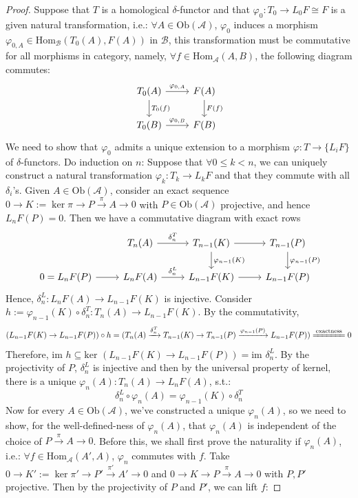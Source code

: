 \begin{proof}
    Suppose that $T$ is a homological $\delta$-functor and that $\varphi_0: T_0\to L_0F\cong F$ is a given natural transformation, i.e.: $\forall A\in \text{Ob} (\mathcal{A})$, $\varphi_0$ induces a morphism $\varphi_{0,A}\in \text{Hom}_\mathcal{B} (T_0(A) ,F(A))$ in $\mathcal{B}$, this transformation must be commutative for all morphisms in category, namely, $\forall f \in \text{Hom}_\mathcal{A} (A,B)$, the following diagram commutes:
    \[
    \begin{tikzcd}
        T_0(A) \arrow[r, "\varphi_{0,A}"] \arrow[d, "T_0(f)"] &F(A) \arrow[d, "F(f)"]\\
        T_0(B) \arrow[r, "\varphi_{0,B}"] &F(B)
    \end{tikzcd}
    \]
    We need to show that $\varphi_0$ admits a unique extension to a morphism $\varphi: T\to \{L_iF\}$ of $\delta$-functors. Do induction on $n$: Suppose that $\forall 0\leq k<n$, we can uniquely construct a natural transformation $\varphi_k: T_k\to L_kF$ and that they commute with all $\delta_i$'s. Given $A\in \text{Ob} (\mathcal{A})$, consider an exact sequence $0\to K:= \ker \pi\to P\xrightarrow{\pi} A\to0$ with $P\in \text{Ob} (\mathcal{A})$ projective, and hence $L_nF(P)=0$. Then we have a commutative diagram with exact rows
    \[
    \begin{tikzcd}
        &T_n (A)\arrow[r, "\delta_n^T"] &T_{n-1}(K) \arrow[r] \arrow[d, "\varphi_{n-1} (K)"]& T_{n-1} (P) \arrow[d, "\varphi_{n-1}(P)"]\\
        0=L_nF(P) \arrow[r] &L_nF(A) \arrow[r, "\delta_n^L"] &L_{n-1}F(K) \arrow[r] &L_{n-1}F(P)
    \end{tikzcd}
    \]
    Hence, $\delta_n^L: L_nF(A) \to L_{n-1} F(K)$ is injective. Consider $h:=\varphi _{n-1} (K) \circ \delta_n^T: T_n(A) \to L_{n-1} F(K)$. By the commutativity,
    \[
    (L_{n-1} F(K)\to L_{n-1} F(P)) \circ h=(T_n(A) \xrightarrow{\delta_n^T} T_{n-1} (K) \to T_{n-1} (P) \xrightarrow{\varphi_{n-1} (P)} L_{n-1} F(P)) \xlongequal{\text{exactness}} 0
    \]
    Therefore, $\text{im }h \subseteq \text{ker } (L_{n-1} F(K) \to L_{n-1} F(P))= \text{im }\delta_n^L$. By the projectivity of $P$, $\delta_n^L$ is injective and then by the universal property of kernel, there is a unique $\varphi_n(A): T_n(A) \to L_nF(A)$, s.t.:
    \[
    \delta_n^L \circ \varphi_n (A)= \varphi_{n-1} (K) \circ \delta_n^T
    \]
    Now for every $A\in \text{Ob} (\mathcal{A})$, we've constructed a unique $\varphi_n(A)$, so we need to show, for the well-defined-ness of $\varphi_n(A)$, that $\varphi_n (A)$ is independent of the choice of $P\xrightarrow{\pi} A\to0$. Before this, we shall first prove the naturality if $\varphi_n(A)$, i.e.: $\forall f\in \text{Hom}_\mathcal{A} (A',A)$, $\varphi_n$ commutes with $f$. Take $0\to K':= \ker \pi' \to P'\xrightarrow{\pi'} A' \to0$ and $0\to K\to P\xrightarrow{\pi}A \to0$ with $P,P'$ projective. Then by the projectivity of $P$ and $P'$, we can lift $f$:

\end{proof}
